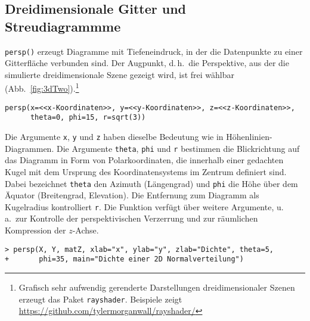\subsection{Dreidimensionale Gitter und Streudiagrammme}
\label{sec:3dGrid}

\lstinline!persp()! erzeugt Diagramme mit Tiefeneindruck, in der die Datenpunkte zu einer Gitterfläche verbunden sind. Der Augpunkt, d.\,h.\ die Perspektive, aus der die simulierte dreidimensionale Szene gezeigt wird, ist frei wählbar (Abb.\ \ref{fig:3dTwo}).\footnote{Grafisch sehr aufwendig gerenderte Darstellungen dreidimensionaler Szenen erzeugt das Paket \lstinline!rayshader!\cite{MorganWall2019}. Beispiele zeigt \url{https://github.com/tylermorganwall/rayshader/}}
\begin{lstlisting}
persp(x=<<x-Koordinaten>>, y=<<y-Koordinaten>>, z=<<z-Koordinaten>>,
      theta=0, phi=15, r=sqrt(3))
\end{lstlisting}

Die Argumente \lstinline!x!, \lstinline!y! und \lstinline!z! haben dieselbe Bedeutung wie in Höhenlinien-Diagrammen. Die Argumente \lstinline!theta!, \lstinline!phi! und \lstinline!r! bestimmen die Blickrichtung auf das Diagramm in Form von Polarkoordinaten, die innerhalb einer gedachten Kugel mit dem Ursprung des Koordinatensystems im Zentrum definiert sind. Dabei bezeichnet \lstinline!theta! den Azimuth (Längengrad) und \lstinline!phi! die Höhe über dem Äquator (Breitengrad, Elevation). Die Entfernung zum Diagramm als Kugelradius kontrolliert \lstinline!r!. Die Funktion verfügt über weitere Argumente, u.\,a.\ zur Kontrolle der perspektivischen Verzerrung und zur räumlichen Kompression der $z$-Achse.
\begin{lstlisting}
> persp(X, Y, matZ, xlab="x", ylab="y", zlab="Dichte", theta=5,
+       phi=35, main="Dichte einer 2D Normalverteilung")
\end{lstlisting}

